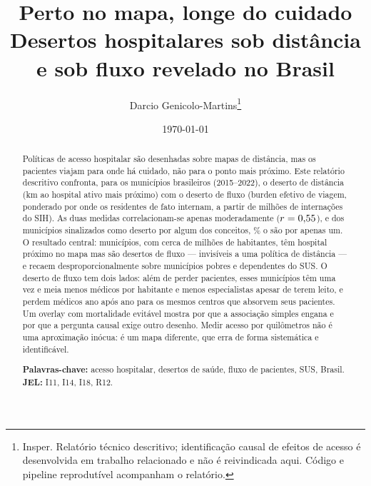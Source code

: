 \documentclass[11pt]{article}
\title{\textbf{Perto no mapa, longe do cuidado}\\[0.35em]
\large Desertos hospitalares sob distância e sob fluxo revelado no Brasil}
\author{Darcio Genicolo-Martins\thanks{Insper. Relatório técnico descritivo;
identificação causal de efeitos de acesso é desenvolvida em trabalho relacionado
e não é reivindicada aqui. Código e pipeline reprodutível acompanham o relatório.}}
\date{\today}
\begin{document}
\maketitle

\begin{abstract}
\noindent
Políticas de acesso hospitalar são desenhadas sobre mapas de distância, mas os
pacientes viajam para onde há cuidado, não para o ponto mais próximo. Este
relatório descritivo confronta, para os \valNmunic{} municípios brasileiros (2015--2022),
o deserto de distância (km ao hospital ativo mais próximo) com o deserto de
fluxo (burden efetivo de viagem, ponderado por onde os residentes de fato
internam, a partir de \valNaih{} milhões de internações do SIH). As duas medidas
correlacionam-se apenas moderadamente ($r=0{,}55$), e dos municípios
sinalizados como deserto por algum dos conceitos, \valPctDisagree\% o são por
apenas um. O resultado central: \valFOn{} municípios, com cerca de \valFOpop{}
milhões de habitantes, têm hospital
próximo no mapa mas são desertos de fluxo --- invisíveis a uma política de
distância --- e recaem desproporcionalmente sobre municípios pobres e dependentes
do SUS. O deserto de fluxo tem dois lados: além de perder pacientes, esses
municípios têm uma vez e meia menos médicos por habitante e menos especialistas
apesar de terem leito, e perdem médicos ano após ano para os mesmos centros que
absorvem seus pacientes. Um overlay com mortalidade evitável mostra por que a
associação simples engana e por que a pergunta causal exige outro desenho. Medir
acesso por quilômetros não é uma aproximação inócua: é um mapa diferente, que
erra de forma sistemática e identificável.

\medskip
\noindent\textbf{Palavras-chave:} acesso hospitalar, desertos de saúde, fluxo de
pacientes, SUS, Brasil. \quad\textbf{JEL:} I11, I14, I18, R12.
\end{abstract}





















\end{document}

